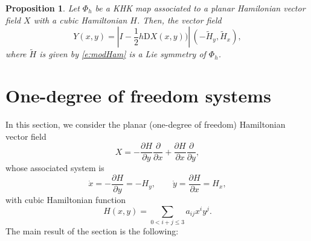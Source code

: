 \documentclass[11pt]{article}
\newtheorem {proposition} [theorem]{Proposition}
\begin{document}
\begin{proposition}\label{p:propo3} Let $\Phi_h$ be a KHK map associated to a \emph{planar} Hamilonian vector field $X$ with a cubic Hamiltonian $H$. Then, the vector field
$$
Y(x,y)=\left|I-\frac{1}{2}h {\mathrm D}X(x,y))\right|\,\left(-\widetilde{H}_y,\widetilde{H}_x\right),
$$
where $\widetilde{H}$ is given by \eqref{e:modHam} is a Lie symmetry of $\Phi_h$.
\end{proposition}




\section{One-degree of freedom systems}\label{s:r2}
In this section, we consider the planar (one-degree of freedom) Hamiltonian vector field
$$
X=-\frac{\partial H}{\partial y} \frac{\partial}{\partial x}+\frac{\partial H}{\partial x}\frac{\partial}{\partial y},
$$
whose associated system is
\begin{equation}\label{e:ham2}
 \dot{x}=-\dfrac{\partial H}{\partial y}=-H_y, \qquad
\dot{y}=\dfrac{\partial H}{\partial x}=H_x,
\end{equation}
with  cubic Hamiltonian function
\begin{equation}\label{e:genham}
H(x,y)=\displaystyle{\sum\limits_{0< i+j\leq 3}} a_{ij}x^iy^j.
 \end{equation}
The main result of the section is the following:
\end{document}
